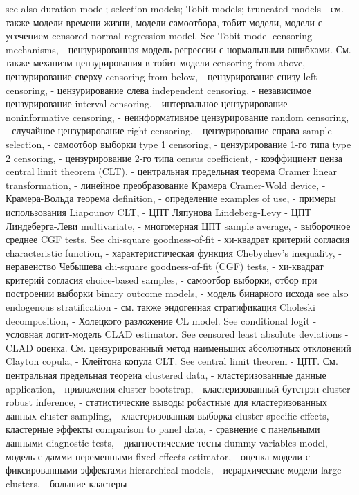 see also duration model; selection models; Tobit models; truncated models - см. также модели времени жизни, модели самоотбора, тобит-модели, модели с усечением
censored normal regression model. See Tobit model censoring mechanisms, - цензурированная модель регрессии с нормальными ошибками. См. также механизм цензурирования в тобит модели
censoring from above, - цензурирование сверху
censoring from below, - цензурирование снизу
left censoring, - цензурирование слева
independent censoring, - независимое цензурирование
interval censoring, - интервальное цензурирование
noninformative censoring, - неинформативное цензурирование
random censoring, - случайное цензурирование
right censoring, - цензурирование справа
sample selection, - самоотбор выборки
type 1 censoring, - цензурирование 1-го типа
type 2 censoring, - цензурирование 2-го типа
census coefficient, - коэффициент ценза
central limit theorem (CLT), - центральная предельная теорема
Cramer linear transformation, - линейное преобразование Крамера
Cramer-Wold device, - Крамера-Вольда теорема
definition, - определение
examples of use, - примеры использования
Liapounov CLT, - ЦПТ Ляпунова
Lindeberg-Levy - ЦПТ Линдеберга-Леви
multivariate, - многомерная ЦПТ
sample average, - выборочное среднее
CGF tests. See chi-square goodness-of-fit - хи-квадрат критерий согласия
characteristic function, - характеристическая функция
Chebychev’s inequality, - неравенство Чебышева
chi-square goodness-of-fit (CGF) tests, - хи-квадрат критерий согласия
choice-based samples, - самоотбор выборки, отбор при построении выборки
binary outcome models, - модель бинарного исхода
see also endogenous stratification - см. также эндогенная стратификация
Choleski decomposition, - Холецкого разложение
CL model. See conditional logit - условная логит-модель
CLAD estimator. See censored least absolute deviations - CLAD оценка. См. цензурированный метод наименьших абсолютных отклонений
Clayton copula, - Клейтона копула
CLT. See central limit theorem - ЦПТ. См. центральная предельная теореиа
clustered data, - кластеризованные данные
application, - приложения
cluster bootstrap, - кластеризованный бутстрэп
cluster-robust inference, - статистические выводы робастные для кластеризованных данных
cluster sampling, - кластеризованная выборка
cluster-specific effects, - кластерные эффекты
comparison to panel data, - сравнение с панельными данными
diagnostic tests, - диагностические тесты
dummy variables model, - модель с дамми-переменными
fixed effects estimator, - оценка модели с фиксированными эффектами
hierarchical models, - иерархические модели
large clusters, - большие кластеры
